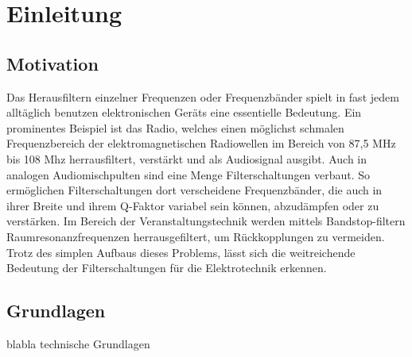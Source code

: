 \section{Einleitung}

\subsection{Motivation}
Das Herausfiltern einzelner Frequenzen oder Frequenzbänder spielt in fast jedem alltäglich benutzen elektronischen Geräts eine essentielle Bedeutung. Ein prominentes Beispiel ist das Radio, welches einen möglichst schmalen Frequenzbereich der elektromagnetischen Radiowellen im Bereich von 87,5 MHz bis 108 Mhz \cite{radio} herrausfiltert, verstärkt und als Audiosignal ausgibt.
Auch in analogen Audiomischpulten sind eine Menge Filterschaltungen verbaut. So ermöglichen Filterschaltungen dort verscheidene Frequenzbänder, die auch in ihrer Breite und ihrem Q-Faktor variabel sein können, abzudämpfen oder zu verstärken. Im Bereich der Veranstaltungstechnik werden mittels Bandstop-filtern Raumresonanzfrequenzen herrausgefiltert, um Rückkopplungen zu vermeiden. Trotz des simplen Aufbaus dieses Problems, lässt sich die weitreichende Bedeutung der Filterschaltungen für die Elektrotechnik erkennen.

\subsection{Grundlagen}
blabla technische Grundlagen
